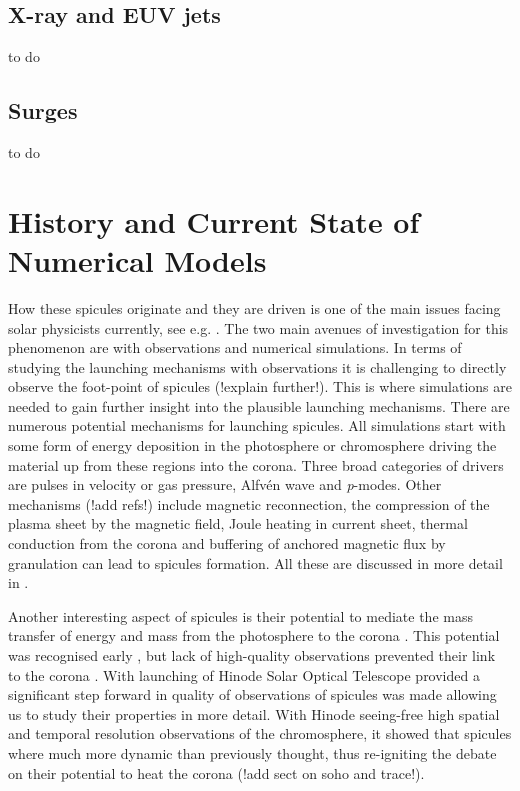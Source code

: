 \documentclass[12pt]{ociamthesis}
\newcommand{\Alfven}{Alfv\'{e}n }
\begin{document}
\subsection{X-ray and EUV jets}
\label{subsec:euv}
to do
\subsection{Surges}
\label{subsec:surge}
to do
\section{History and Current State of Numerical Models}
\label{sec:models}
How these spicules originate and they are driven is one of the main issues facing solar physicists currently, see e.g. \citep{kuz2017ApJ,Tsiropoula2012,Martinez-Sykora2017}. The two main avenues of investigation for this phenomenon are with observations and numerical simulations. In terms of studying the launching mechanisms with observations it is challenging to directly observe the foot-point of spicules (!explain further!). This is where simulations are needed to gain further insight into the plausible launching mechanisms. There are numerous potential mechanisms for launching spicules. All simulations start with some form of energy deposition in the photosphere or chromosphere driving the material up from these regions into the corona. Three broad categories of drivers are pulses in velocity or gas pressure, \Alfven wave and \textit{p}-modes. Other mechanisms (!add refs!) include magnetic reconnection, the compression of the plasma sheet by the magnetic field, Joule heating in current sheet, thermal conduction from the corona and buffering of anchored magnetic flux by granulation can lead to spicules formation. All these are discussed in more detail in \cite{Sterling_2000SoPh}. \\
\par Another interesting aspect of spicules is their potential to mediate the mass transfer of energy and mass from the photosphere to the corona \citep{Pereira2012, Pontieu2004Natur}. This potential was recognised early \citep{Beckers1968}, but lack of high-quality observations prevented their link to the corona \citep{Withbroe1983ApJ}. With launching of Hinode Solar Optical Telescope provided a significant step forward in quality of observations of spicules was made allowing us to study their properties in more detail. With Hinode seeing-free high spatial and temporal resolution observations of the chromosphere, it showed that spicules where much more dynamic than previously thought, thus re-igniting the debate on their potential to heat the corona \citep{Pontieu2007PASJ} (!add sect on soho and trace!). \\
\end{document}
